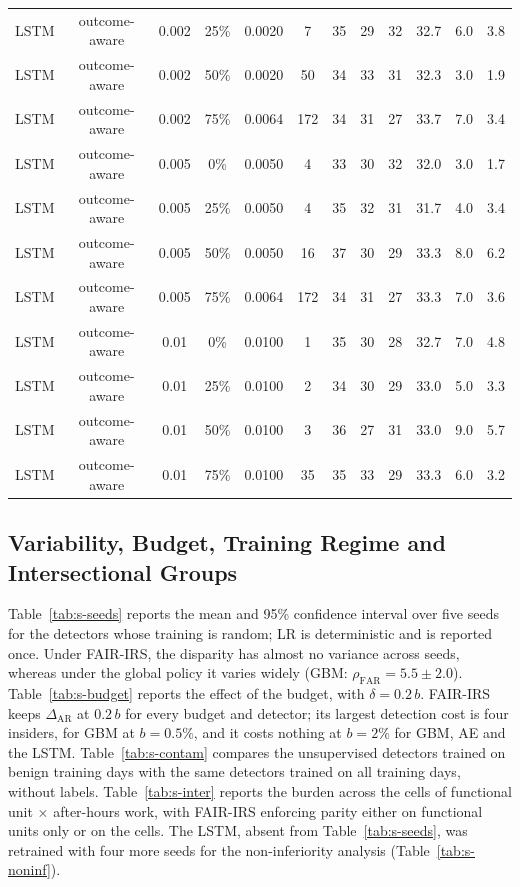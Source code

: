 \documentclass[10pt,onecolumn,letterpaper]{article}
\newcommand{\AR}{\mathrm{AR}}
\newcommand{\FAR}{\mathrm{FAR}}
\begin{document}
\begin{table}[!t]
{\begin{tabular}{lccccccccccc}
LSTM & outcome-aware & 0.002 & 25\% & 0.0020 & 7 & 35 & 29 & 32 & 32.7 & 6.0 & 3.8 \\
LSTM & outcome-aware & 0.002 & 50\% & 0.0020 & 50 & 34 & 33 & 31 & 32.3 & 3.0 & 1.9 \\
LSTM & outcome-aware & 0.002 & 75\% & 0.0064 & 172 & 34 & 31 & 27 & 33.7 & 7.0 & 3.4 \\
LSTM & outcome-aware & 0.005 & 0\% & 0.0050 & 4 & 33 & 30 & 32 & 32.0 & 3.0 & 1.7 \\
LSTM & outcome-aware & 0.005 & 25\% & 0.0050 & 4 & 35 & 32 & 31 & 31.7 & 4.0 & 3.4 \\
LSTM & outcome-aware & 0.005 & 50\% & 0.0050 & 16 & 37 & 30 & 29 & 33.3 & 8.0 & 6.2 \\
LSTM & outcome-aware & 0.005 & 75\% & 0.0064 & 172 & 34 & 31 & 27 & 33.3 & 7.0 & 3.6 \\
LSTM & outcome-aware & 0.01 & 0\% & 0.0100 & 1 & 35 & 30 & 28 & 32.7 & 7.0 & 4.8 \\
LSTM & outcome-aware & 0.01 & 25\% & 0.0100 & 2 & 34 & 30 & 29 & 33.0 & 5.0 & 3.3 \\
LSTM & outcome-aware & 0.01 & 50\% & 0.0100 & 3 & 36 & 27 & 31 & 33.0 & 9.0 & 5.7 \\
LSTM & outcome-aware & 0.01 & 75\% & 0.0100 & 35 & 35 & 33 & 29 & 33.3 & 6.0 & 3.2 \\
\bottomrule
\end{tabular}}
\end{table}

\subsection{Variability, Budget, Training Regime and Intersectional Groups}
Table~\ref{tab:s-seeds} reports the mean and 95\% confidence interval over five seeds for the detectors whose training is random; LR is deterministic and is reported once. Under FAIR-IRS, the disparity has almost no variance across seeds, whereas under the global policy it varies widely (GBM: $\rho_{\FAR}=5.5\pm2.0$). Table~\ref{tab:s-budget} reports the effect of the budget, with $\delta=0.2\,b$. FAIR-IRS keeps $\Delta_{\AR}$ at $0.2\,b$ for every budget and detector; its largest detection cost is four insiders, for GBM at $b=0.5\%$, and it costs nothing at $b=2\%$ for GBM, AE and the LSTM. Table~\ref{tab:s-contam} compares the unsupervised detectors trained on benign training days with the same detectors trained on all training days, without labels. Table~\ref{tab:s-inter} reports the burden across the cells of functional unit $\times$ after-hours work, with FAIR-IRS enforcing parity either on functional units only or on the cells. The LSTM, absent from Table~\ref{tab:s-seeds}, was retrained with four more seeds for the non-inferiority analysis (Table~\ref{tab:s-noninf}).
\end{document}
